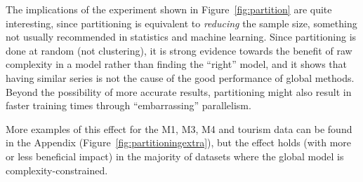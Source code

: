 \documentclass[a4paper]{article}
\theoremstyle{custom}
\begin{document}

The implications of the experiment shown in Figure~\ref{fig:partition} are quite interesting, since partitioning is equivalent to \textit{reducing} the sample size, something not usually recommended in statistics and machine learning. Since partitioning is done at random (not clustering), it is strong evidence towards the benefit of raw complexity in a model rather than finding the ``right'' model, and it shows that having similar series is not the cause of the good performance of global methods.
Beyond the possibility of more accurate results, partitioning might also result in faster training times through ``embarrassing'' parallelism.

More examples of this effect for the M1, M3, M4 and tourism data can be found in the Appendix (Figure~\ref{fig:partitioningextra}), but the effect holds (with more or less beneficial impact) in the majority of datasets where the global model is complexity-constrained.
\end{document}
